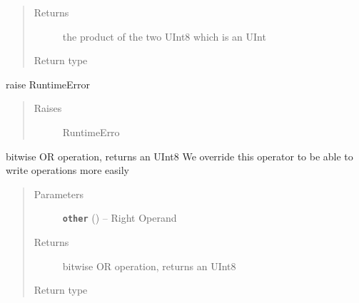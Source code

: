 \documentclass[letterpaper,10pt,english]{sphinxmanual}
\begin{document}
\begin{fulllineitems}
\begin{fulllineitems}
\begin{quote}
\begin{description}
\item[{Returns}] \leavevmode
the product of the two UInt8 which is an UInt

\item[{Return type}] \leavevmode
{\hyperref[datatypes.integers:module\string-datatypes.integers.UInt]{}}

\end{description}\end{quote}

\end{fulllineitems}


\begin{fulllineitems}
\label{datatypes.integers:datatypes.integers.UInt8.UInt8.__neg__}
raise RuntimeError
\begin{quote}\begin{description}
\item[{Raises}] \leavevmode
RuntimeErro

\end{description}\end{quote}

\end{fulllineitems}


\begin{fulllineitems}
\label{datatypes.integers:datatypes.integers.UInt8.UInt8.__or__}
bitwise OR operation, returns an UInt8
We override this operator to be able to write operations more easily
\begin{quote}\begin{description}
\item[{Parameters}] \leavevmode
\textbf{\texttt{other}} ({\hyperref[datatypes.integers:datatypes.integers.UInt8.UInt8]{}}) -- Right Operand

\item[{Returns}] \leavevmode
bitwise OR operation, returns an UInt8

\item[{Return type}] \leavevmode
{\hyperref[datatypes.integers:datatypes.integers.UInt8.UInt8]{}}

\end{description}\end{quote}


\end{fulllineitems}
\end{fulllineitems}
\end{document}
